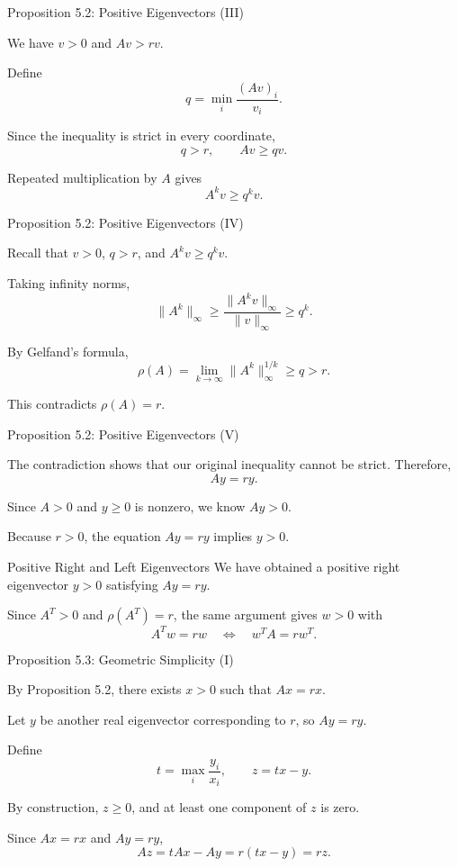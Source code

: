 \documentclass{beamer}
\begin{document}
\begin{frame}{Proposition 5.2: Positive Eigenvectors (III)}
\small

We have $v>0$ and $Av>rv$.

Define
\[
q=\min_i\frac{(Av)_i}{v_i}.
\]

Since the inequality is strict in every
coordinate,
\[
q>r,\qquad Av\geq qv.
\]


Repeated multiplication by $A$ gives
\[
A^kv\geq q^kv.
\]
\end{frame}

\begin{frame}{Proposition 5.2: Positive Eigenvectors (IV)}
\small

Recall that $v>0$, $q>r$, and $A^kv\geq q^kv$.

Taking infinity norms,
\[
\|A^k\|_\infty
\geq
\frac{\|A^kv\|_\infty}{\|v\|_\infty}
\geq q^k.
\]

By Gelfand's formula,
\[
\rho(A)=\lim_{k\to\infty}
\|A^k\|_\infty^{1/k}\geq q>r.
\]

This contradicts $\rho(A)=r$.
\end{frame}

\begin{frame}{Proposition 5.2: Positive Eigenvectors (V)}
\small

The contradiction shows that our
original inequality cannot be strict.
Therefore,
\[
Ay=ry.
\]

Since $A>0$ and $y\geq0$ is nonzero,
we know $Ay>0$.

Because $r>0$, the equation $Ay=ry$
implies $y>0$.

\begin{block}{Positive Right and Left Eigenvectors}
We have obtained a positive right
eigenvector $y>0$ satisfying $Ay=ry$.

Since $A^T>0$ and $\rho(A^T)=r$,
the same argument gives $w>0$ with
\[
A^Tw=rw
\quad\Longleftrightarrow\quad
w^TA=rw^T.
\]
\end{block}
\end{frame}

\begin{frame}{Proposition 5.3: Geometric Simplicity (I)}
\small

By Proposition 5.2, there exists $x>0$
such that $Ax=rx$.

Let $y$ be another real eigenvector
corresponding to $r$, so $Ay=ry$.

Define
\[
t=\max_i\frac{y_i}{x_i},
\qquad z=tx-y.
\]

By construction, $z\geq0$, and at least
one component of $z$ is zero.

Since $Ax=rx$ and $Ay=ry$,
\[
Az=tAx-Ay=r(tx-y)=rz.
\]
\end{frame}
\end{document}
